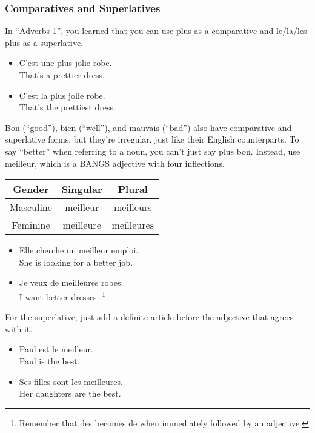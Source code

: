 \subsubsection{Comparatives and Superlatives}

In ``Adverbs 1'', you learned that you can use plus as a comparative and le/la/les plus as a superlative.

\begin{itemize}
  \item  C'est une plus jolie robe. \\ That's a prettier dress.
  \item  C'est la plus jolie robe. \\ That's the prettiest dress.
\end{itemize}

Bon (``good''), bien (``well''), and mauvais (``bad'') also have comparative and superlative forms, but they're irregular, just like their English counterparts.  To say ``better'' when referring to a noun, you can't just say plus bon. Instead, use meilleur, which is a BANGS adjective with four inflections.

\begin{center}\begin{tabular}{|c|c|c|}
\hline
\textbf{Gender} & \textbf{Singular} & \textbf{Plural} \\ \hline
Masculine       & meilleur          & meilleurs       \\ \hline
Feminine        & meilleure         & meilleures      \\ \hline
\end{tabular}\end{center}

\begin{itemize}
  \item  Elle cherche un meilleur emploi. \\ She is looking for a better job.
  \item  Je veux de meilleures robes. \\ I want better dresses. \footnote{Remember that des becomes de when immediately followed by an adjective.}
\end{itemize}

For the superlative, just add a definite article before the adjective that agrees with it.

\begin{itemize}
  \item  Paul est le meilleur. \\ Paul is the best.
  \item  Ses filles sont les meilleures. \\ Her daughters are the best.
\end{itemize}

